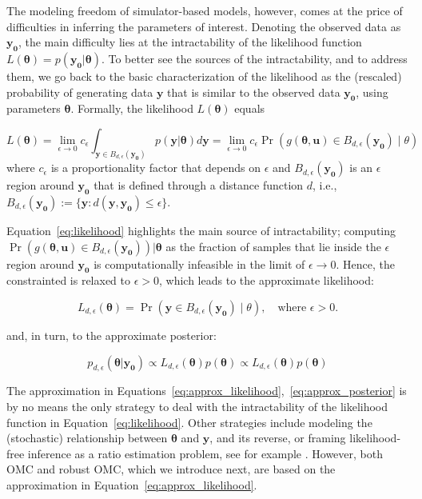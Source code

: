 \documentclass[article]{jss}
\newcommand{\ub}{\mathbf{u}}
\newcommand{\yb}{\mathbf{y}}
\newcommand{\thetab}{\boldsymbol{\theta}}
\newcommand{\simulator}{g}
\newcommand{\region}{B_{d,\epsilon}}
\newcommand{\data}{\mathbf{y_0}}
\begin{document}
The modeling freedom of simulator-based models, however, comes at the
price of difficulties in inferring the parameters of
interest. Denoting the observed data as \(\data\), the main difficulty
lies at the intractability of the likelihood function
\(L(\thetab) = p(\data|\thetab)\). To better see the sources of the
intractability, and to address them, we go back to the basic
characterization of the likelihood as the (rescaled) probability of
generating data \(\yb\) that is similar to the observed data
\(\data\), using parameters \(\thetab\). Formally, the likelihood
\(L(\thetab)\) equals

\begin{equation}
  \label{eq:likelihood}
  L(\thetab) = \lim_{\epsilon \to 0} c_\epsilon \int_{\yb \in B_{d,\epsilon}(\data)} p(\yb|\thetab)d\yb =
  \lim_{\epsilon \to 0} c_\epsilon \Pr(\simulator(\thetab, \ub) \in \region(\data)  \mid \theta)
\end{equation}
where \(c_\epsilon\) is a proportionality factor that depends on
\(\epsilon\) and \(\region(\data)\) is an \(\epsilon\) region around
\(\data\) that is defined through a distance function \(d\), i.e., \
\(\region(\data) := \{\yb: d(\yb, \data) \leq \epsilon \}\).

Equation~\ref{eq:likelihood} highlights the main source of
intractability; computing
\(\Pr(\simulator(\thetab,\ub) \in \region(\data)) | \thetab\) as the
fraction of samples that lie inside the \(\epsilon\) region around
\(\data\) is computationally infeasible in the limit of
\(\epsilon \to 0\). Hence, the constrainted is relaxed to
\(\epsilon > 0\), which leads to the approximate likelihood:

\begin{equation}
  \label{eq:approx_likelihood}
  L_{d, \epsilon}(\thetab) = \Pr(\yb \in \region(\data) \mid \theta), \quad \text{where  } \epsilon > 0.
\end{equation}

and, in turn, to the approximate posterior:

\begin{equation} \label{eq:approx_posterior}
  p_{d,\epsilon}(\thetab|\data)
  \propto L_{d, \epsilon}(\thetab) p(\thetab)
  \propto L_{d, \epsilon}(\thetab) p(\thetab)
\end{equation}

The approximation in
Equations~\ref{eq:approx_likelihood},~\ref{eq:approx_posterior} is by
no means the only strategy to deal with the intractability of the
likelihood function in Equation~\ref{eq:likelihood}. Other strategies include
modeling the (stochastic) relationship between \(\thetab\) and
\(\yb\), and its reverse, or framing likelihood-free inference as a
ratio estimation problem, see for example \citet{blum2010, Wood2006,
  Papamakarios2016, Papamakarios2019, Chen2019, Thomas2020,
  Hermans2020}. However, both OMC and robust OMC, which we introduce
next, are based on the approximation in Equation~\ref{eq:approx_likelihood}.
\end{document}
